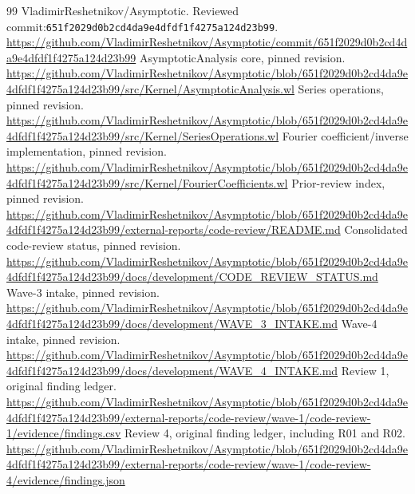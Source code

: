 \documentclass[11pt,a4paper]{article}
\newcommand{\revision}{\texttt{651f2029d0b2cd4da9e4dfdf1f4275a124d23b99}}
\begin{document}
\begin{thebibliography}{99}
\small
{} VladimirReshetnikov/Asymptotic. Reviewed commit:\newline\revision.\newline
\url{https://github.com/VladimirReshetnikov/Asymptotic/commit/651f2029d0b2cd4da9e4dfdf1f4275a124d23b99}
 AsymptoticAnalysis core, pinned revision.\newline
\url{https://github.com/VladimirReshetnikov/Asymptotic/blob/651f2029d0b2cd4da9e4dfdf1f4275a124d23b99/src/Kernel/AsymptoticAnalysis.wl}
 Series operations, pinned revision.\newline
\url{https://github.com/VladimirReshetnikov/Asymptotic/blob/651f2029d0b2cd4da9e4dfdf1f4275a124d23b99/src/Kernel/SeriesOperations.wl}
 Fourier coefficient/inverse implementation, pinned revision.\newline
\url{https://github.com/VladimirReshetnikov/Asymptotic/blob/651f2029d0b2cd4da9e4dfdf1f4275a124d23b99/src/Kernel/FourierCoefficients.wl}
 Prior-review index, pinned revision.\newline
\url{https://github.com/VladimirReshetnikov/Asymptotic/blob/651f2029d0b2cd4da9e4dfdf1f4275a124d23b99/external-reports/code-review/README.md}
 Consolidated code-review status, pinned revision.\newline
\url{https://github.com/VladimirReshetnikov/Asymptotic/blob/651f2029d0b2cd4da9e4dfdf1f4275a124d23b99/docs/development/CODE_REVIEW_STATUS.md}
 Wave-3 intake, pinned revision.\newline
\url{https://github.com/VladimirReshetnikov/Asymptotic/blob/651f2029d0b2cd4da9e4dfdf1f4275a124d23b99/docs/development/WAVE_3_INTAKE.md}
 Wave-4 intake, pinned revision.\newline
\url{https://github.com/VladimirReshetnikov/Asymptotic/blob/651f2029d0b2cd4da9e4dfdf1f4275a124d23b99/docs/development/WAVE_4_INTAKE.md}
 Review 1, original finding ledger.\newline
\url{https://github.com/VladimirReshetnikov/Asymptotic/blob/651f2029d0b2cd4da9e4dfdf1f4275a124d23b99/external-reports/code-review/wave-1/code-review-1/evidence/findings.csv}
 Review 4, original finding ledger, including R01 and R02.\newline
\url{https://github.com/VladimirReshetnikov/Asymptotic/blob/651f2029d0b2cd4da9e4dfdf1f4275a124d23b99/external-reports/code-review/wave-1/code-review-4/evidence/findings.json}

\end{thebibliography}
\end{document}
